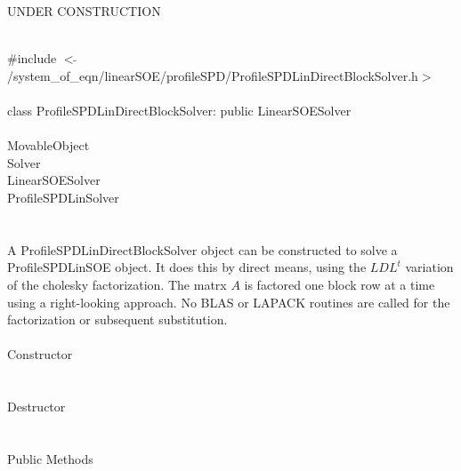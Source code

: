 
UNDER CONSTRUCTION 

   \\
\indent \#include $<\tilde{
}$/system\_of\_eqn/linearSOE/profileSPD/ProfileSPDLinDirectBlockSolver.h$>$
\\ 

  \\
\indent class ProfileSPDLinDirectBlockSolver: public LinearSOESolver  \\

 \\
\indent MovableObject \\
\indent\indent  Solver \\
\indent\indent\indent LinearSOESolver \\
\indent\indent\indent\indent ProfileSPDLinSolver \\
\indent\indent\indent\indent{} \\

  \\
\indent A ProfileSPDLinDirectBlockSolver object can be constructed to
solve a ProfileSPDLinSOE object. It does this by direct means, using
the $LDL^t$ variation of the cholesky factorization. The matrx $A$ is
factored one block row at a time using a right-looking approach. No BLAS
or LAPACK routines are called for the factorization or subsequent substitution. \\

  \\
\indent\indent Constructor \\
\indent{}  \\ \\
\indent\indent Destructor \\
\indent{}\\  \\
\indent\indent Public Methods \\
\indent{} \\
\indent{} \\
\indent{}\\ 
\indent{}\\ 


